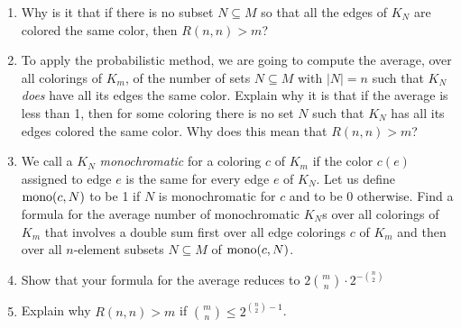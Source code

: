\begin{enumerate}
\item Why is it that if there is no subset $N\subseteq M$
so that all the edges of $K_N$ are colored the same color, then
$R(n,n)>m$? 
\item To apply the probabilistic method, we are going to compute
the average, over all colorings of $K_m$, of the number of sets
$N\subseteq M$ with
$|N|=n$ such that $K_N$ {\em does} have all its edges the same color.
Explain why it is that if the average is less than 1, then for some
coloring there is no set $N$ such that $K_N$ has all its edges colored
the same color.  Why does this mean that $R(n,n)>m$?
\item We call a $K_N$ {\em monochromatic}
for a coloring $c$ of $K_m$ if the color $c(e)$ assigned to edge $e$ is
the same for every edge $e$ of $K_N$.  Let us define ${\rm mono}(c,N)$ to
be 1 if $N$ is monochromatic for $c$ and to be 0 otherwise.  Find a
formula for the average number of monochromatic $K_N$s over all colorings
of $K_m$ that involves a double sum first over all edge colorings $c$ of
$K_m$ and then over all $n$-element subsets $N\subseteq M$ of ${\rm
mono}(c,N)$.
\item  Show that your formula for the average reduces to $2{m\choose
n}\cdot2^{-{n\choose 2}}$
\item Explain why $R(n,n)>m$ if ${m\choose n}\le 2^{{n\choose 2} -1}$.

\end{enumerate}

